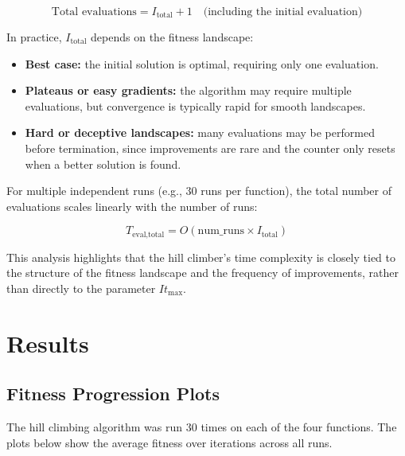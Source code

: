 \documentclass[11pt]{article}
\begin{document}
\[
\text{Total evaluations} = I_\text{total} + 1 \quad \text{(including the initial evaluation)}
\]

In practice, $I_\text{total}$ depends on the fitness landscape:  
\begin{itemize}
    \item \textbf{Best case:} the initial solution is optimal, requiring only one evaluation.  
    \item \textbf{Plateaus or easy gradients:} the algorithm may require multiple evaluations, but convergence is typically rapid for smooth landscapes.  
    \item \textbf{Hard or deceptive landscapes:} many evaluations may be performed before termination, since improvements are rare and the counter only resets when a better solution is found.
\end{itemize}

For multiple independent runs (e.g., 30 runs per function), the total number of evaluations scales linearly with the number of runs:

\[
T_\text{eval,total} = O(\text{num\_runs} \times I_\text{total})
\]

This analysis highlights that the hill climber’s time complexity is closely tied to the structure of the fitness landscape and the frequency of improvements, rather than directly to the parameter $It_\text{max}$.

\section{Results}
\label{section-results}

\subsection{Fitness Progression Plots}
The hill climbing algorithm was run 30 times on each of the four functions. The plots below show the average fitness over iterations across all runs.
\end{document}
